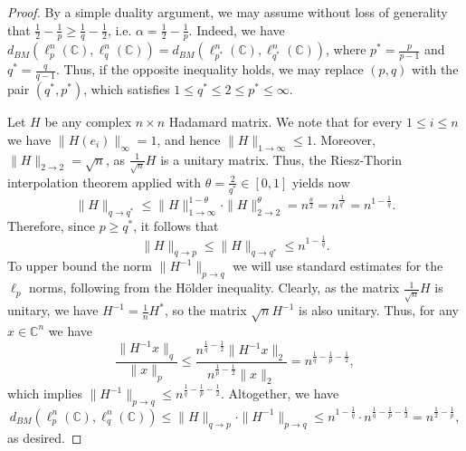 \documentclass[12pt, a4paper]{article}
\theoremstyle{plain} %
\theoremstyle{definition} %
\theoremstyle{remark} %
\begin{document}
\begin{proof}

By a simple duality argument, we may assume without loss of generality that $\frac{1}{2}-\frac{1}{p} \geq \frac{1}{q}-\frac{1}{2}$, i.e. $\alpha = \frac{1}{2} - \frac{1}{p}$. Indeed, we have $d_{BM}(\ell_p^n(\mathbb{C}), \ell_q^n(\mathbb{C})) = d_{BM}(\ell_{p^*}^n(\mathbb{C}), \ell_{q^*}^n(\mathbb{C}))$, where $p^* = \frac{p}{p-1}$ and $q^* = \frac{q}{q-1}$. Thus, if the opposite inequality holds, we may replace $(p,q)$ with the pair $(q^*, p^*)$, which satisfies $1 \leq q^* \leq 2 \leq p^* \leq \infty$.


Let $H$ be any complex $n \times n$ Hadamard matrix. We note that for every $1 \leq i \leq n$ we have $\|H(e_i)\|_{\infty} = 1$, and hence $\|H\|_{1 \to \infty} \leq 1$. Moreover, $\|H\|_{2 \to 2} = \sqrt{n}$, as $\frac{1}{\sqrt{n}} H$ is a unitary matrix. Thus, the Riesz-Thorin interpolation theorem applied with $\theta = \frac{2}{q^*} \in [0,1]$ yields now
$$\|H\|_{q \to q^*} \leq \|H\|^{1-\theta}_{1 \to \infty} \cdot \|H\|^{\theta}_{2 \to 2}=n^{\frac{\theta}{2}}=n^{\frac{1}{q^*}}=n^{1-\frac{1}{q}}.$$
Therefore, since  $p \geq q^*$, it follows that
$$\|H\|_{q \to p} \leq \|H\|_{q \to q^*} \leq n^{1-\frac{1}{q}}.$$
To upper bound the norm $\|H^{-1}\|_{p \to q}$ we will use standard estimates for the $\ell_p$ norms, following from the H\"older inequality. Clearly, as the matrix $\frac{1}{\sqrt{n}}H$ is unitary, we have $H^{-1}=\frac{1}{n}H^*$, so the matrix $\sqrt{n}H^{-1}$ is also unitary. Thus, for any $x \in \mathbb{C}^n$ we have
\begin{equation}
\label{hadamard}
\frac{\|H^{-1}x\|_q}{\|x\|_p} \leq \frac{n^{\frac{1}{q}-\frac{1}{2}}\|H^{-1}x\|_2}{n^{\frac{1}{p}-\frac{1}{2}}\|x\|_2} = n^{\frac{1}{q} - \frac{1}{p} - \frac{1}{2}},
\end{equation}
which implies $\|H^{-1}\|_{p \to q} \leq n^{\frac{1}{q} - \frac{1}{p} - \frac{1}{2}}$. Altogether, we have
$$d_{BM}(\ell_p^n(\mathbb{C}), \ell_q^n(\mathbb{C})) \leq \|H\|_{q \to p} \cdot \|H^{-1}\|_{p \to q} \leq n^{1-\frac{1}{q}} \cdot n^{\frac{1}{q} - \frac{1}{p} - \frac{1}{2}} = n^{\frac{1}{2} - \frac{1}{p}},$$
as desired.
\end{proof}
\end{document}

